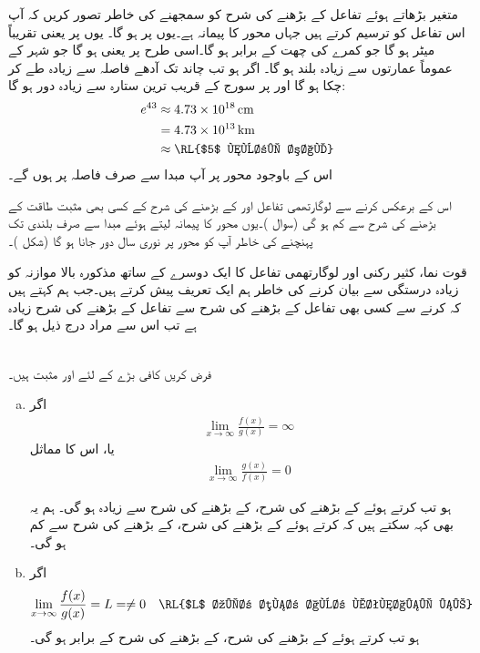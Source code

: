 متغیر  بڑھاتے ہوئے تفاعل  کے بڑھنے کی شرح کو سمجھنے کی خاطر تصور کریں کہ آپ اس تفاعل کو ترسیم کرتے ہیں جہاں محور کا پیمانہ   ہے۔یوں  پر  ہو گا۔ یوں  پر  یعنی تقریباً  میٹر ہو گا جو کمرے کی چھت کے برابر ہو گا۔اسی طرح  پر
  یعنی  ہو گا جو شہر کے عموماً عمارتوں سے زیادہ بلند ہو گا۔ اگر  ہو تب  چاند تک آدھے فاصلہ سے زیادہ طے کر چکا ہو گا اور  پر  سورج کے قریب ترین ستارہ سے زیادہ دور ہو گا:
\begin{align*}
e^{43}&\approx \SI{4.73e18}{\centi\meter}\\
&=\SI{4.73e13}{\kilo\meter}\\
&\approx \text{\RL{$5$ نوری سال}}
\end{align*} 
اس کے باوجود  محور پر آپ مبدا سے صرف  فاصلہ پر ہوں گے۔

اس کے برعکس  کرنے سے لوگارتھمی تفاعل  اور  کے بڑھنے کی شرح  کے کسی بھی مثبت طاقت کے بڑھنے کی شرح سے کم ہو گی (سوال )۔یوں محور کا پیمانہ  لیتے ہوئے مبدا سے صرف  بلندی تک پہنچنے کی خاطر آپ کو محور  پر  نوری سال دور جانا ہو گا (شکل )۔

قوت نما، کثیر رکنی اور لوگارتھمی تفاعل کا ایک دوسرے کے ساتھ مذکورہ بالا موازنہ کو زیادہ درستگی سے بیان کرنے کی خاطر ہم ایک تعریف پیش کرتے ہیں۔جب ہم کہتے ہیں کہ  کرنے سے کسی بھی تفاعل  کے بڑھنے کی شرح سے  تفاعل  کے بڑھنے کی شرح زیادہ ہے تب اس سے مراد درج ذیل ہو گا۔

\\
فرض کریں کافی بڑے  کے لئے  اور  مثبت ہیں۔
\begin{enumerate}[a.]
\item
اگر 
\begin{align*}
\lim_{x\to\infty}\frac{f(x)}{g(x)}=\infty
\end{align*}
یا، اس کا مماثل
\begin{align*}
\lim_{x\to\infty}\frac{g(x)}{f(x)}=0
\end{align*}

ہو تب   کرتے ہوئے  کے بڑھنے کی شرح،  کے بڑھنے کی شرح سے زیادہ ہو گی۔ ہم یہ بھی کہہ سکتے ہیں کہ  کرتے ہوئے  کے بڑھنے کی شرح،  کے بڑھنے کی شرح سے کم ہو گی۔
\item
اگر
\begin{align*}
\lim_{x\to\infty}\frac{f(x)}{g(x)}&=L=\ne 0&&\text{\RL{$L$ غیر صفر اور متناہی ہے}}
\end{align*}
ہو تب  کرتے ہوئے  کے بڑھنے کی شرح،   کے بڑھنے کی شرح کے برابر ہو گی۔
\end{enumerate}

